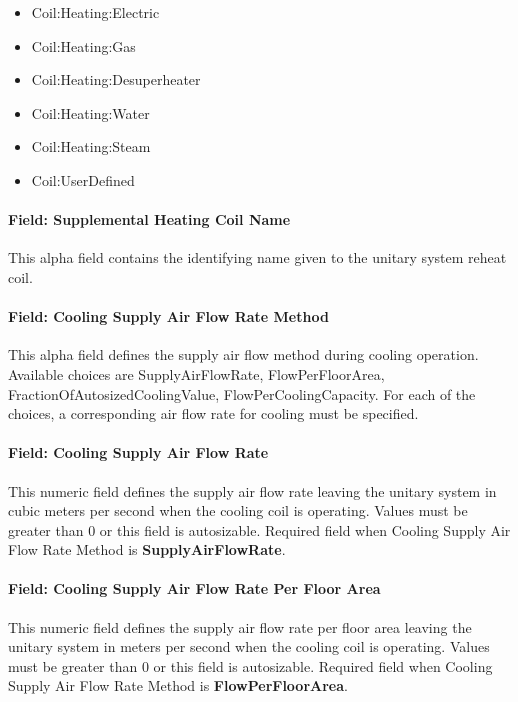 \begin{itemize}
\item
  Coil:Heating:Electric
\item
  Coil:Heating:Gas
\item
  Coil:Heating:Desuperheater
\item
  Coil:Heating:Water
\item
  Coil:Heating:Steam
\item
  Coil:UserDefined
\end{itemize}

\paragraph{Field: Supplemental Heating Coil Name}\label{field-supplemental-heating-coil-name}

This alpha field contains the identifying name given to the unitary system reheat coil.

\paragraph{Field: Cooling Supply Air Flow Rate Method}\label{field-cooling-supply-air-flow-rate-method-000}

This alpha field defines the supply air flow method during cooling operation. Available choices are SupplyAirFlowRate, FlowPerFloorArea, FractionOfAutosizedCoolingValue, FlowPerCoolingCapacity. For each of the choices, a corresponding air flow rate for cooling must be specified.

\paragraph{Field: Cooling Supply Air Flow Rate}\label{field-cooling-supply-air-flow-rate-001}

This numeric field defines the supply air flow rate leaving the unitary system in cubic meters per second when the cooling coil is operating. Values must be greater than 0 or this field is autosizable. Required field when Cooling Supply Air Flow Rate Method is \textbf{SupplyAirFlowRate}.

\paragraph{Field: Cooling Supply Air Flow Rate Per Floor Area}\label{field-cooling-supply-air-flow-rate-per-floor-area}

This numeric field defines the supply air flow rate per floor area leaving the unitary system in meters per second when the cooling coil is operating. Values must be greater than 0 or this field is autosizable. Required field when Cooling Supply Air Flow Rate Method is \textbf{FlowPerFloorArea}.

